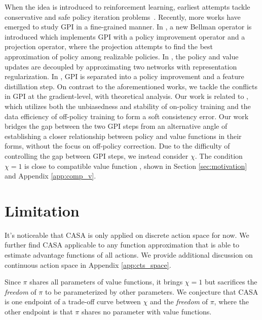 When the idea is introduced to reinforcement learning, earliest attempts  tackle  conservative and safe policy iteration problems~\citep{KakadeL02,HazanK11,PirottaRPC13}. Recently, more works have emerged to study GPI in a fine-grained manner. In \citep{op_reinforce}, 
a new Bellman operator is introduced which implements GPI with a policy improvement operator and a projection operator, where the projection attempts to find the best approximation of policy among  realizable policies. 
In \citep{RaileanuF21}, the policy and value updates are decoupled by approximating two networks with representation regularization. 
In \citep{CobbeHKS21}, GPI  is separated into a policy improvement and a feature distillation step. On contrast to the aforementioned works, we tackle the conflicts in GPI at the gradient-level, with theoretical analysis. 
Our work is related to \citep{pcl}, which utilizes both the unbiasedness and stability of on-policy training and the data efficiency of off-policy training to form a soft consistency error. Our work bridges the gap between the two GPI steps from an alternative angle of establishing a closer relationship between policy and value functions in their forms, without the focus on off-policy correction.     
{ Due to the difficulty of controlling the gap between GPI steps, we instead consider $\chi$. 
The condition $\chi = 1$ is close to compatible value function \citep{sutton1999policy, kakade2001natural}, shown in Section \ref{sec:motivation} and Appendix \ref{app:comp_v}.}

{ 
\section{Limitation}
\label{sec:limit}
It's noticeable that CASA is only applied on discrete action space for now. 
We further find CASA applicable to any function approximation that is able to estimate advantage functions of all actions.
We provide additional discussion on continuous action space in Appendix \ref{app:cts_space}.

Since $\pi$ shares all parameters of value functions, it brings $\chi=1$ but sacrifices the \textit{freedom} of $\pi$ to be parameterized by other parameters. 
We conjecture that CASA is one endpoint of a trade-off curve between $\chi$ and the \textit{freedom} of $\pi$, where the other endpoint is that $\pi$ shares no parameter with value functions. 
}
